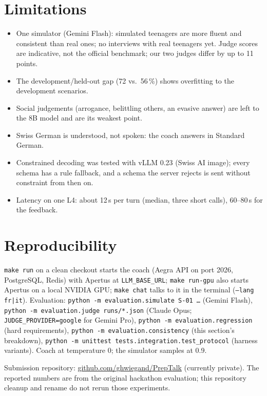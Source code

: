 \documentclass[10pt,a4paper]{article}
\newcommand{\repository}{\href{https://github.com/ghwiegand/PrepTalk}{github.com/ghwiegand/PrepTalk}}
\newcommand{\devOpus}{72}        %
\newcommand{\hoOpus}{56}         %
\newcommand{\turnMedian}{12}
\begin{document}
\section{Limitations}
\begin{itemize}
\item One simulator (Gemini Flash): simulated teenagers are more fluent and consistent than real ones; no interviews with real teenagers yet.
Judge scores are indicative, not the official benchmark; our two judges differ by up to 11 points.
\item The development/held-out gap (\devOpus{} vs.\ \hoOpus\,\%) shows overfitting to the development scenarios.
\item Social judgements (arrogance, belittling others, an evasive answer) are left to the 8B model and are its weakest point.
\item Swiss German is understood, not spoken: the coach answers in Standard German.
\item Constrained decoding was tested with vLLM 0.23 (Swiss AI image); every schema has a rule fallback, and a schema the server rejects is
sent without constraint from then on.
\item Latency on one L4: about \turnMedian{}\,s per turn (median, three short calls), 60--80\,s for the feedback.
\end{itemize}

\section{Reproducibility}\label{sec:repro}
\texttt{make run} on a clean checkout starts the coach (Aegra API on port 2026, PostgreSQL, Redis) with Apertus at \texttt{LLM\_BASE\_URL};
\texttt{make run-gpu} also starts Apertus on a local NVIDIA GPU; \texttt{make chat} talks to it in the terminal (\texttt{--lang fr|it}).
Evaluation: \texttt{python -m evaluation.simulate S-01 \ldots} (Gemini Flash), \texttt{python -m evaluation.judge runs/*.json} (Claude Opus;
\texttt{JUDGE\_PROVIDER=google} for Gemini Pro), \texttt{python -m evaluation.regression} (hard requirements),
\texttt{python -m evaluation.consistency} (this section's breakdown), \texttt{python -m unittest tests.integration.test\_protocol} (harness variants).
Coach at temperature 0; the simulator samples at 0.9.

Submission repository: \repository{} (currently private).
The reported numbers are from the original hackathon evaluation; this repository cleanup and rename do not rerun those experiments.
\end{document}
